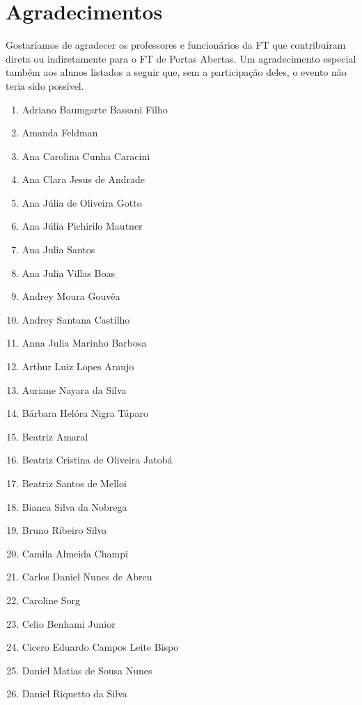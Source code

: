 \documentclass[
  letterpaper,
  DIV=11,
  numbers=noendperiod]{scrreprt}
\providecommand{\tightlist}{%
  \setlength{\itemsep}{0pt}\setlength{\parskip}{0pt}}\usepackage{longtable,booktabs,array}
\begin{document}

\chapter{Agradecimentos}\label{agradecimentos}

Gostaríamos de agradecer os professores e funcionários da FT que
contribuíram direta ou indiretamente para o FT de Portas Abertas. Um
agradecimento especial também aos alunos listados a seguir que, sem a
participação deles, o evento não teria sido possível.

\begin{enumerate}
\def\labelenumi{\arabic{enumi}.}
\tightlist
\item
  Adriano Baumgarte Bassani Filho
\item
  Amanda Feldman
\item
  Ana Carolina Cunha Caracini
\item
  Ana Clara Jesus de Andrade
\item
  Ana Júlia de Oliveira Gotto
\item
  Ana Júlia Pichirilo Mautner
\item
  Ana Julia Santos
\item
  Ana Julia Villas Boas
\item
  Andrey Moura Gouvêa
\item
  Andrey Santana Castilho
\item
  Anna Julia Marinho Barbosa
\item
  Arthur Luiz Lopes Araujo
\item
  Auriane Nayara da Silva
\item
  Bárbara Helóra Nigra Táparo
\item
  Beatriz Amaral
\item
  Beatriz Cristina de Oliveira Jatobá
\item
  Beatriz Santos de Melloi
\item
  Bianca Silva da Nobrega
\item
  Bruno Ribeiro Silva
\item
  Camila Almeida Champi
\item
  Carlos Daniel Nunes de Abreu
\item
  Caroline Sorg
\item
  Celio Benhami Junior
\item
  Cicero Eduardo Campos Leite Bispo
\item
  Daniel Matias de Sousa Nunes
\item
  Daniel Riquetto da Silva

\end{enumerate}
\end{document}
